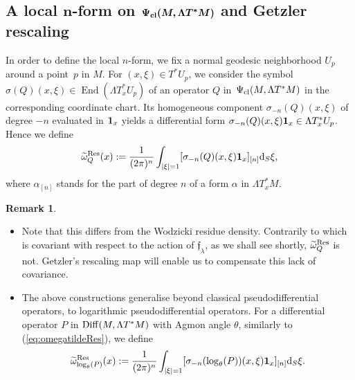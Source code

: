 \documentclass[pdftex]{sigma}
\numberwithin{equation}{section}
\theoremstyle{definition}
\newtheorem{rk}[thm]{Remark}
\begin{document}
\subsection[A local n-form on Psi\_\{cl\} (M, Lambda T\^{}*M) and Getzler rescaling]{A local $\boldsymbol{n}$-form on $\boldsymbol{\Psi_{\rm cl} (M, \Lambda T^*M)}$ and Getzler rescaling}
In order to define the local $n$-form, we fix a normal geodesic neighborhood $U_p$ around a point~$p$ in $M$. For $(x, \xi)\in T^*U_p$, we consider the symbol $\sigma(Q)(x, \xi) \in \operatorname{End}(\Lambda T_x^*U_p)$ of an operator $Q$ in~$\Psi_{\rm cl}(M, \Lambda T^*M)$ in the corresponding coordinate chart. Its homogeneous component $\sigma_{-n}(Q)(x, \xi)$ of degree $-n$ evaluated in ${\bf 1}_x$ yields a differential form
$\sigma_{-n}(Q)(x, \xi) {\bf 1}_x \in \Lambda T_x^*U_p$. Hence we define
\begin{equation}\label{eq:omegatildeRes}
\widetilde \omega^{\rm Res}_Q(x):= \frac{1}{(2\pi)^n} \int_{|\xi|=1} [ \sigma_{-n} (Q) (x, \xi) {\bf 1}_x ]_{[n]} {\rm d}_S\xi,
\end{equation}
where $\alpha_{[n]}$ stands for the part of degree $n$ of a form $\alpha$ in $\Lambda T_x^*M$.

\begin{rk}\quad
\begin{itemize}\itemsep=0pt
\item Note that this differs from the Wodzicki residue density. Contrarily to  which is covariant with respect to the action of ${\mathfrak f}_{ \lambda}$, as we shall see shortly, $\widetilde \omega^{\rm Res}_Q$ is not. Getzler's rescaling map will enable us to compensate this lack of covariance.
\item The above constructions generalise beyond classical pseudodifferential operators, to logarithmic pseudodifferential operators. For a differential operator $P$ in ${\rm Diff}(M, \Lambda T^* M)$ with Agmon angle $\theta$, similarly to (\ref{eq:omegatildeRes}), we define
\begin{equation*}
\widetilde \omega^{\rm Res}_{\log_\theta(P)}(x):= \frac{1}{(2\pi)^n} \int_{|\xi|=1}[ \sigma_{-n} (\log_\theta (P)) (x, \xi) {\bf 1}_x]_{[n]} {\rm d}_S\xi.
\end{equation*}
\end{itemize}
\end{rk}
\end{document}
